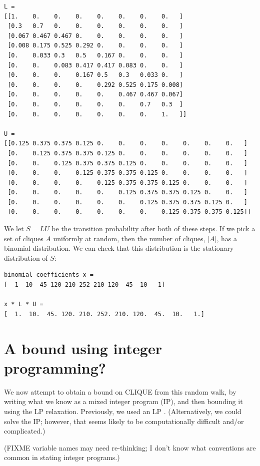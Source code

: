 \documentclass[12pt]{article}
\theoremstyle{definition}
\begin{document}
\begin{verbatim}
L =
[[1.    0.    0.    0.    0.    0.    0.    0.   ]
 [0.3   0.7   0.    0.    0.    0.    0.    0.   ]
 [0.067 0.467 0.467 0.    0.    0.    0.    0.   ]
 [0.008 0.175 0.525 0.292 0.    0.    0.    0.   ]
 [0.    0.033 0.3   0.5   0.167 0.    0.    0.   ]
 [0.    0.    0.083 0.417 0.417 0.083 0.    0.   ]
 [0.    0.    0.    0.167 0.5   0.3   0.033 0.   ]
 [0.    0.    0.    0.    0.292 0.525 0.175 0.008]
 [0.    0.    0.    0.    0.    0.467 0.467 0.067]
 [0.    0.    0.    0.    0.    0.    0.7   0.3  ]
 [0.    0.    0.    0.    0.    0.    0.    1.   ]]

U =
[[0.125 0.375 0.375 0.125 0.    0.    0.    0.    0.    0.    0.   ]
 [0.    0.125 0.375 0.375 0.125 0.    0.    0.    0.    0.    0.   ]
 [0.    0.    0.125 0.375 0.375 0.125 0.    0.    0.    0.    0.   ]
 [0.    0.    0.    0.125 0.375 0.375 0.125 0.    0.    0.    0.   ]
 [0.    0.    0.    0.    0.125 0.375 0.375 0.125 0.    0.    0.   ]
 [0.    0.    0.    0.    0.    0.125 0.375 0.375 0.125 0.    0.   ]
 [0.    0.    0.    0.    0.    0.    0.125 0.375 0.375 0.125 0.   ]
 [0.    0.    0.    0.    0.    0.    0.    0.125 0.375 0.375 0.125]]
\end{verbatim}

We let $S = LU$ be the transition probability after both of these steps.
If we pick a set of cliques $A$ uniformly at random,
then the number of cliques, $|A|$, has a binomial distribution.
We can check that this distribution
is the stationary distribution of $S$:

\begin{verbatim}
binomial coefficients x =
[  1  10  45 120 210 252 210 120  45  10   1]

x * L * U =
[  1.  10.  45. 120. 210. 252. 210. 120.  45.  10.   1.]
\end{verbatim}

\section{A bound using integer programming?}

We now attempt to obtain a bound on CLIQUE from this random walk, by
writing what we know as a mixed integer program (IP), and then bounding it
using the LP relaxation. Previously, we used an LP \cite{buggyclique}.
(Alternatively, we could solve the IP; however, that seems likely to
be computationally difficult and/or complicated.)

(FIXME variable names may need re-thinking; I don't know what
conventions are common in stating integer programs.)
\end{document}
